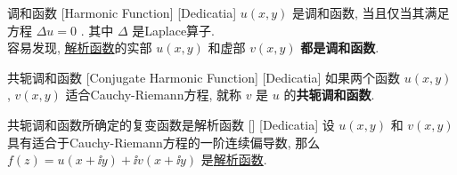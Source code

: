 \documentclass[UTF8]{ctexart}
\newcommand{\AnalyticalFunction}{\hyperref[dfn:AnalyticalFunction]{解析函数}}
\begin{document}
\begin{dfn}
    [UUID]
    {调和函数}
    [Harmonic Function]
    [Dedicatia]
     \( u(x,y) \) 是调和函数, 当且仅当其满足方程 \( \Delta u=0 \) . 其中 \( \Delta \) 是Laplace算子. \\
    容易发现, \AnalyticalFunction 的实部 \( u(x,y) \) 和虚部 \( v(x,y) \) \textbf{都是调和函数}. 
\end{dfn}
\begin{dfn}
    [UUID]
    {共轭调和函数}
    [Conjugate Harmonic Function]
    [Dedicatia]
    如果两个函数 \( u(x,y) \) ,  \( v(x,y) \) 适合Cauchy-Riemann方程, 就称 \( v \) 是 \( u \) 的\textbf{共轭调和函数}. 
\end{dfn}
\begin{thm}
    [UUID]
    {共轭调和函数所确定的复变函数是解析函数}
    []
    [Dedicatia]
    设 \( u(x,y) \) 和 \( v(x,y) \) 具有适合于Cauchy-Riemann方程的一阶连续偏导数, 那么 \( f(z)=u(x+\ii y)+\ii v(x+\ii y) \) 是\AnalyticalFunction . 
\end{thm}
\end{document}
